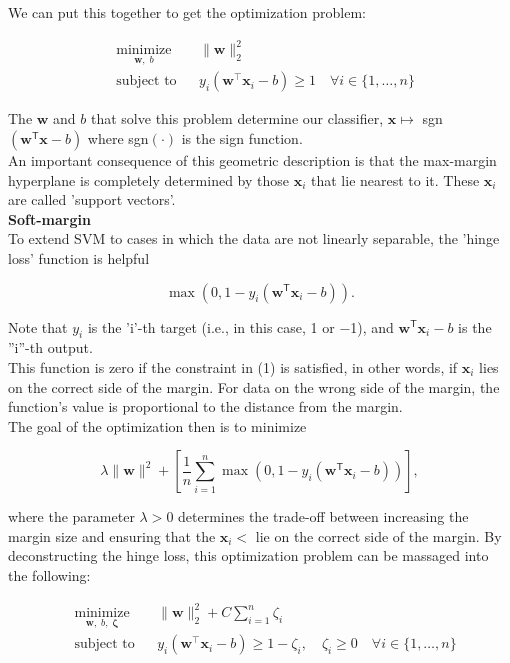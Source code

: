 We can put this together to get the optimization problem:

\begin{align}
&\underset{\mathbf{w},\;b}{\operatorname{minimize}} && \|\mathbf{w}\|_2^2\\
&\text{subject to} && y_i(\mathbf{w}^\top \mathbf{x}_i - b) \geq 1 \quad \forall i \in \{1,\dots,n\}
\end{align}

The \(\mathbf{w}\) and \(b\) that solve this problem determine our classifier, \(\mathbf{x} \mapsto\) sgn\((\mathbf{w}^\mathsf{T} \mathbf{x} - b) \) where sgn\((\cdot)\) is the sign function.
\\

An important consequence of this geometric description is that the max-margin hyperplane is completely determined by those  \(\mathbf{x}_i\) that lie nearest to it. These \(\mathbf{x}_i\) are called 'support vectors'.
\\

\textbf{Soft-margin} \\
To extend SVM to cases in which the data are not linearly separable, the 'hinge loss' function is helpful

\[\max\left(0, 1 - y_i(\mathbf{w}^\mathsf{T} \mathbf{x}_i - b)\right).\]

Note that \(y_i\) is the 'i'-th target (i.e., in this case, 1 or −1), and \(\mathbf{w}^\mathsf{T} \mathbf{x}_i - b\) is the ''i''-th output.
\\

This function is zero if the constraint in {(1)} is satisfied, in other words, if $\mathbf{x}_i$ lies on the correct side of the margin. For data on the wrong side of the margin, the function's value is proportional to the distance from the margin.
\\

The goal of the optimization then is to minimize

\[\lambda \lVert \mathbf{w} \rVert^2 +\left[\frac 1 n \sum_{i=1}^n \max\left(0, 1 - y_i(\mathbf{w}^\mathsf{T} \mathbf{x}_i - b)\right) \right],\]

where the parameter $\lambda > 0$ determines the trade-off between increasing the margin size and ensuring that the \(\mathbf{x}_i<\) lie on the correct side of the margin. By deconstructing the hinge loss, this optimization problem can be massaged into the following:

\begin{align}
&\underset{\mathbf{w},\;b,\;\mathbf{\zeta}}{\operatorname{minimize}} &&\|\mathbf{w}\|_2^2 + C\sum_{i=1}^n \zeta_i\\
&\text{subject to} && y_i(\mathbf{w}^\top \mathbf{x}_i - b) \geq 1 - \zeta_i, \quad \zeta_i \geq 0 \quad \forall i\in \{1,\dots,n\}
\end{align}

